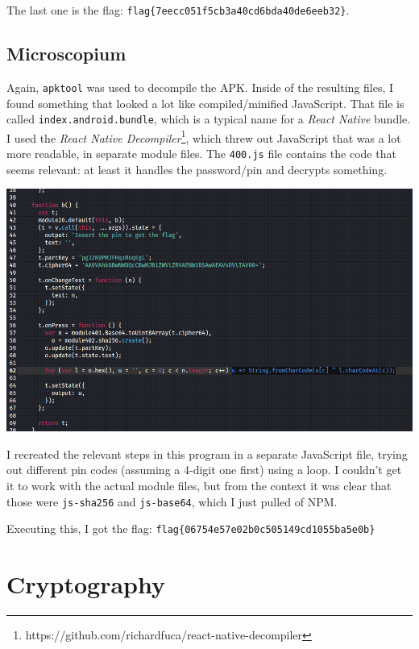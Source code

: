 \documentclass{article}
\begin{document}
\noindent
The last one is the flag: \texttt{flag\{7eecc051f5cb3a40cd6bda40de6eeb32\}}.


\subsection{Microscopium}

Again, \texttt{apktool} was used to decompile the APK. Inside of the resulting files, I found something that looked a lot like compiled/minified JavaScript. That file is called \texttt{index.android.bundle}, which is a typical name for a \textit{React Native} bundle. I used the \textit{React Native Decompiler}\footnote{https://github.com/richardfuca/react-native-decompiler}, which threw out JavaScript that was a lot more readable, in separate module files. The \texttt{400.js} file contains the code that seems relevant: at least it handles the password/pin and decrypts something.

\begin{center}
    \includegraphics[width=16cm]{microscopium/screenshot.png}
\end{center}

\noindent
I recreated the relevant steps in this program in a separate JavaScript file, trying out different pin codes (assuming a 4-digit one first) using a loop. I couldn't get it to work with the actual module files, but from the context it was clear that those were \texttt{js-sha256} and \texttt{js-base64}, which I just pulled of NPM.




\noindent
Executing this, I got the flag: \texttt{flag\{06754e57e02b0c505149cd1055ba5e0b\}}


\section{Cryptography}
\end{document}
